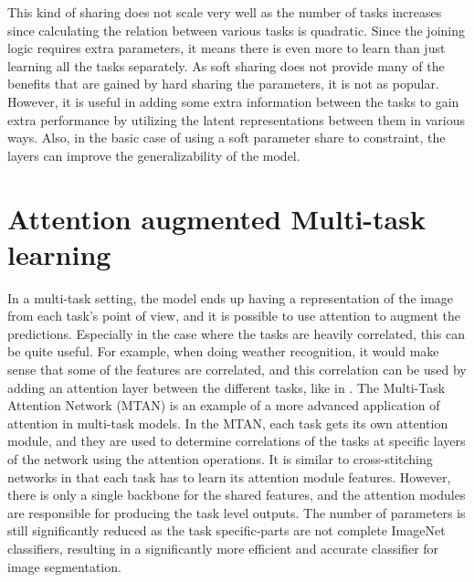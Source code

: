 This kind of sharing does not scale very well as the number of tasks increases since calculating the relation between various tasks is quadratic.
Since the joining logic requires extra parameters, it means there is even more to learn than just learning all the tasks separately.
As soft sharing does not provide many of the benefits that are gained by hard sharing the parameters, it is not as popular.
However, it is useful in adding some extra information between the tasks to gain extra performance by utilizing the latent representations between them in various ways.
Also, in the basic case of using a soft parameter share to constraint, the layers can improve the generalizability of the model.

\section{Attention augmented Multi-task learning}
In a multi-task setting, the model ends up having a representation of the image from each task's point of view, and it is possible to use attention \citep{attention} to augment the predictions.
Especially in the case where the tasks are heavily correlated, this can be quite useful.
For example, when doing weather recognition, it would make sense that some of the features are correlated, and this correlation can be used by adding an attention layer between the different tasks, like in \citep{cnn-rnn}.
The Multi-Task Attention Network (MTAN) \citep{multiTaskAttention} is an example of a more advanced application of attention in multi-task models.
In the MTAN, each task gets its own attention module, and they are used to determine correlations of the tasks at specific layers of the network using the attention operations.
It is similar to cross-stitching networks in that each task has to learn its attention module features.
However, there is only a single backbone for the shared features, and the attention modules are responsible for producing the task level outputs.
The number of parameters is still significantly reduced as the task specific-parts are not complete ImageNet classifiers, resulting in a significantly more efficient and accurate classifier for image segmentation.

